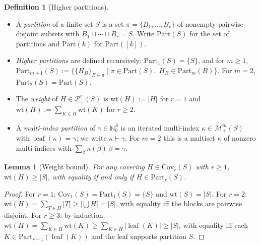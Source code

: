 \documentclass[10pt,a4paper]{article}
\theoremstyle{plain}
\newtheorem{lemma}[theorem]{Lemma}
\theoremstyle{definition}
\newtheorem{definition}[theorem]{Definition}
\newcommand{\IN}{\mathbb{N}} %
\newcommand{\1}{\mathbb{1}} %
\newcommand{\set}[1]{\{#1\}} %
\newcommand{\KP}{\mathcal{P}}
\newcommand{\tightlist}{\setlength{\itemsep}{0pt}\setlength{\parskip}{0pt}}
\newcommand{\KM}{\mathcal{M}} %
\newcommand{\Part}{\mathrm{Part}} %
\newcommand{\Cov}{\mathrm{Cov}} %
\DeclareMathOperator{\lf}{\mathrm{leaf}} %
\begin{document}
\begin{definition}[Higher partitions]

\label{def:higher-partitions}

\begin{itemize}
\tightlist
\item
  A \emph{partition} of a finite set \(S\) is a set
  \(\pi = \set{B_1, \dots, B_r}\) of nonempty pairwise disjoint subsets
  with \(B_1 \sqcup \cdots \sqcup B_r = S\). Write \(\Part(S)\) for the
  set of partitions and \(\Part(k)\) for \(\Part([k])\).
\item
  \emph{Higher partitions} are defined recursively:
  \(\Part_1(S) = \set{S}\), and for \(m \geq 1\),
  \(\Part_{m+1}(S) := \set{\set{H_B}_{B \in \pi} \mid \pi \in \Part(S),\; H_B \in \Part_m(B)}\).
  For \(m = 2\), \(\Part_2(S) = \Part(S)\).
\item
  The \emph{weight} of \(H \in \KP_+^r(S)\) is \(\mathrm{wt}(H) := |H|\)
  for \(r = 1\) and \(\mathrm{wt}(H) := \sum_{K \in H} \mathrm{wt}(K)\)
  for \(r \geq 2\).
\item
  A \emph{multi-index partition} of \(\gamma \in \IN_0^S\) is an
  iterated multi-index \(\kappa \in \KM_+^m(S)\) with
  \(\lf(\kappa) = \gamma\); we write \(\kappa \vdash \gamma\). For
  \(m = 2\) this is a multiset \(\kappa\) of nonzero multi-indices with
  \(\sum_\beta \kappa(\beta)\, \beta = \gamma\).
\end{itemize}

\end{definition}

\begin{lemma}[Weight bound]

\label{lem:weight-bound} For any covering \(H \in \Cov_r(S)\) with
\(r \geq 1\), \(\mathrm{wt}(H) \geq |S|\), with equality if and only if
\(H \in \Part_r(S)\).

\end{lemma}

\begin{proof}

For \(r = 1\): \(\Cov_1(S) = \Part_1(S) = \set{S}\) and
\(\mathrm{wt}(S) = |S|\). For \(r = 2\):
\(\mathrm{wt}(H) = \sum_{T \in H} |T| \geq |\bigcup H| = |S|\), with
equality iff the blocks are pairwise disjoint. For \(r \geq 3\): by
induction,
\(\mathrm{wt}(H) = \sum_{K \in H} \mathrm{wt}(K) \geq \sum_{K \in H} |\lf(K)| \geq |S|\),
with equality iff each \(K \in \Part_{r-1}(\lf(K))\) and the leaf
supports partition \(S\).

\end{proof}
\end{document}

